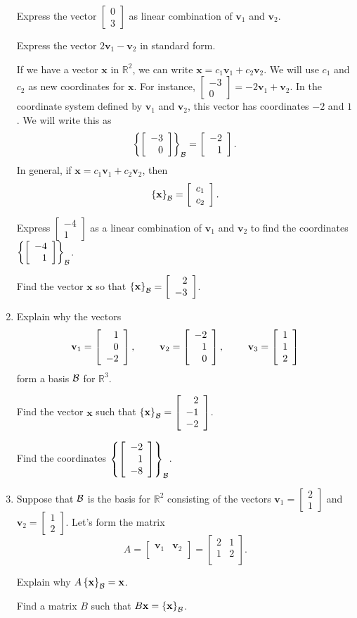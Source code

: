 \documentclass[12pt]{article}
\newcommand{\vs}[1]{\vspace{#1in}}
\newcommand{\vvec}{{\mathbf v}}
\newcommand{\xvec}{{\mathbf x}}
\newcommand{\real}{{\mathbb R}}
\newcommand{\twovec}[2]{\left[\begin{array}{r}#1 \\ #2
    \end{array}\right]}
\newcommand{\threevec}[3]{\left[\begin{array}{r}#1 \\ #2 \\ #3
  \end{array}\right]}
\newcommand{\mattwo}[4]{\left[\begin{array}{rr}#1 & #2 \\ #3 & #4 \\ \end{array}\right]}
\newcommand{\bcal}{{\cal B}}
\newcommand{\coords}[2]{\left\{#1\right\}_{#2}}
\begin{document}
\begin{enumerate}
  Express the vector $\twovec03$ as linear combination of $\vvec_1$
  and $\vvec_2$.

  \vs{1}
  Express the vector $2\vvec_1 - \vvec_2$ in standard form.

  \vs{1}
  If we have a vector $\xvec$ in $\real^2$, we can write
  $\xvec=c_1\vvec_1 + c_2\vvec_2$.  We will use $c_1$ and $c_2$ as new
  coordinates for $\xvec$.  For instance,
  $
  \twovec{-3}0 = -2\vvec_1 + \vvec_2$.  In the coordinate system
  defined by $\vvec_1$ and $\vvec_2$, this vector has coordinates $-2$
  and $1$.  We will write this as
  $$
  \coords{\twovec{-3}0}{\bcal} = \twovec{-2}1.
  $$
  In general, if $\xvec=c_1\vvec_1+c_2\vvec_2$, then
  $$
  \coords{\xvec}{\bcal} = \twovec{c_1}{c_2}.
  $$

  Express $\twovec{-4}1$ as a linear combination of $\vvec_1$ and
  $\vvec_2$ to find the coordinates $\coords{\twovec{-4}1}{\bcal}$.

  \vs{1}
  \newpage
  Find the vector $\xvec$ so that $\coords{\xvec}{\bcal} =
  \twovec2{-3}$.

  \vs{1}
\item Explain why the vectors
  $$
  \vvec_1=\threevec10{-2},\hspace*{24pt}
  \vvec_2=\threevec{-2}1{0},\hspace*{24pt}
  \vvec_3=\threevec112
  $$
  form a basis $\bcal$ for $\real^3$.

  \vs{1}
  Find the vector $\xvec$ such that $\coords{\xvec}{\bcal} =
  \threevec2{-1}{-2}$.

  \vs{1}
  Find the coordinates $\coords{\threevec{-2}{1}{-8}}{\bcal}$.

  \vs{1}
\item Suppose that $\bcal$ is the basis for $\real^2$ consisting of
  the vectors $\vvec_1=\twovec21$ and
  $\vvec_2=\twovec12$.  Let's form the matrix
  $$A=\left[\begin{array}{cc}\vvec_1 & \vvec_2 \\ \end{array}\right]
  =\mattwo2112.$$

  \newpage

  Explain why $A\coords{\xvec}{\bcal} = \xvec$.

  \vs{1.5}
  Find a matrix $B$ such that $B\xvec = \coords{\xvec}{\bcal}$.
  
  
    

  
              
    
    


\end{enumerate}
\end{document}
